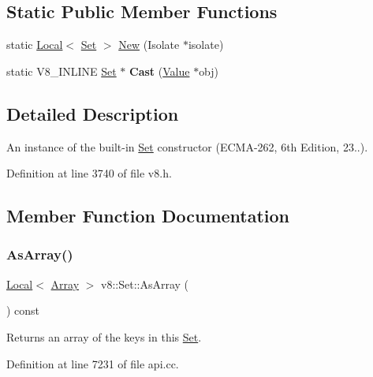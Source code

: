 \subsection*{Static Public Member Functions}
\begin{DoxyCompactItemize}
\item 
static \mbox{\hyperlink{classv8_1_1Local}{Local}}$<$ \mbox{\hyperlink{classv8_1_1Set}{Set}} $>$ \mbox{\hyperlink{classv8_1_1Set_a4fa9826ffcbb58a49e9855ed86a3abac}{New}} (Isolate $\ast$isolate)
\item 
\mbox{\label{classv8_1_1Set_a1739da4ee6bf39c381b83023f653e995}} 
static V8\+\_\+\+I\+N\+L\+I\+NE \mbox{\hyperlink{classv8_1_1Set}{Set}} $\ast$ {\bfseries Cast} (\mbox{\hyperlink{classv8_1_1Value}{Value}} $\ast$obj)
\end{DoxyCompactItemize}


\subsection{Detailed Description}
An instance of the built-\/in \mbox{\hyperlink{classv8_1_1Set}{Set}} constructor (E\+C\+M\+A-\/262, 6th Edition, 23..). 

Definition at line 3740 of file v8.\+h.



\subsection{Member Function Documentation}
\mbox{\label{classv8_1_1Set_a7315c5d4efd3185018180f94c2303975}} 
\subsubsection{\texorpdfstring{As\+Array()}{AsArray()}}
{\footnotesize\ttfamily \mbox{\hyperlink{classv8_1_1Local}{Local}}$<$ \mbox{\hyperlink{classv8_1_1Array}{Array}} $>$ v8\+::\+Set\+::\+As\+Array (\begin{DoxyParamCaption}{ }\end{DoxyParamCaption}) const}

Returns an array of the keys in this \mbox{\hyperlink{classv8_1_1Set}{Set}}. 

Definition at line 7231 of file api.\+cc.

